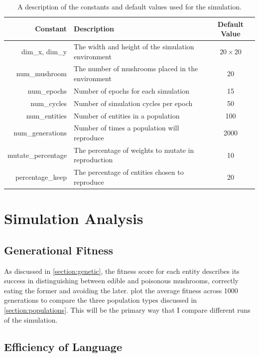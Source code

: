 \documentclass[12pt,a4paper]{report}
\begin{document}
\begin{table}[t]
\centering
 \begin{tabular}{ r | l | c}
 \bf{Constant} & \bf{Description} & \bf{Default Value} \\ [0.5ex] 
 \hline
dim\_x, dim\_y & The width and height of the simulation environment & $20\times20$  \\
num\_mushroom & The number of mushrooms placed in the environment & 20 \\
num\_epochs &  Number of epochs for each simulation & 15 \\ 
num\_cycles & Number of simulation cycles per epoch & 50 \\
num\_entities & Number of entities in a population & 100 \\
num\_generations & Number of times a population will reproduce & 2000 \\
mutate\_percentage & The percentage of weights to mutate in reproduction & 10 \\
percentage\_keep & The percentage of entities chosen to reproduce & 20 \\
\end{tabular}
\caption{A description of the constants and default values used for the simulation.}
\label{table:constants}
\end{table}

\section{Simulation Analysis}\label{section:analysis}

\subsection{Generational Fitness}

As discussed in \cref{section:genetic}, the fitness score for each entity describes its success in distinguishing between edible and poisonous mushrooms, correctly eating the former and avoiding the later. \cite{Cangelosi1998} plot the average fitness across 1000 generations to compare the three population types discussed in \cref{section:populations}. This will be the primary way that I compare different runs of the simulation.

\subsection{Efficiency of Language}\label{section:efficiency}
\end{document}
